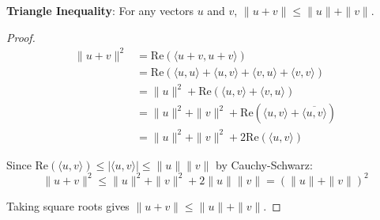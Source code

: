 \begin{theorem}
  \label{theorem : triangle}
  \leanok
  \textbf{Triangle Inequality}: For any vectors $u$ and $v$, $\|u + v\| \leq \|u\| + \|v\|$.
\end{theorem}
\begin{proof}
  \begin{align}
  \|u + v\|^2 &= \text{Re}(\langle u + v, u + v \rangle) \\
  &= \text{Re}(\langle u, u \rangle + \langle u, v \rangle + \langle v, u \rangle + \langle v, v \rangle) \\
  &= \|u\|^2 + \text{Re}(\langle u, v \rangle + \langle v, u \rangle) \\
  &= \|u\|^2 + \|v\|^2 + \text{Re}(\langle u, v \rangle + \overline{\langle u, v \rangle}) \\
  &= \|u\|^2 + \|v\|^2 + 2\text{Re}(\langle u, v \rangle)
  \end{align}
  
  Since $\text{Re}(\langle u, v \rangle) \leq |\langle u, v \rangle| \leq \|u\| \|v\|$ by Cauchy-Schwarz:
  $$\|u + v\|^2 \leq \|u\|^2 + \|v\|^2 + 2\|u\|\|v\| = (\|u\| + \|v\|)^2$$
  
  Taking square roots gives $\|u + v\| \leq \|u\| + \|v\|$.
\end{proof}